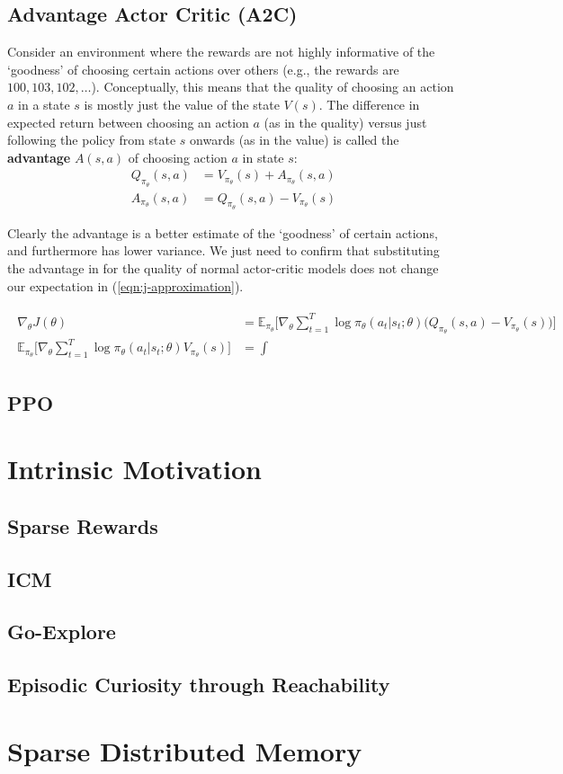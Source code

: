 \documentclass[journal, onecolumn, 12pt, draftclsnofoot]{IEEEtran}
\numberwithin{equation}{section}
\newcommand{\kword}[1]{\textbf{#1}}
\begin{document}
	\subsection{Advantage Actor Critic (A2C)}
	\par Consider an environment where the rewards are not highly informative of the `goodness' of choosing certain actions over others (e.g., the rewards are $100,103,102,\dots$). Conceptually, this means that the quality of choosing an action $a$ in a state $s$ is mostly just the value of the state $V(s)$. The difference in expected return between choosing an action $a$ (as in the quality) versus just following the policy from state $s$ onwards (as in the value) is called the \kword{advantage} $A(s,a)$ of choosing action $a$ in state $s$:
	\begin{align}
		\label{eqn:advantage}
		Q_{\pi_\theta}(s,a) &= V_{\pi_\theta}(s) + A_{\pi_\theta}(s,a) \\
		A_{\pi_\theta}(s,a) &= Q_{\pi_\theta}(s,a) - V_{\pi_\theta}(s) \nonumber
	\end{align}
	\par Clearly the advantage is a better estimate of the `goodness' of certain actions, and furthermore has lower variance. We just need to confirm that substituting the advantage in for the quality of normal actor-critic models does not change our expectation in (\ref{eqn:j-approximation}).

	\begin{align}
		\label{eqn:policy_gradient_theorem_with_baseline}
		\begin{split}
			\nabla_\theta J(\theta) &= \mathbb{E}_{\pi_\theta} \bigg[ \nabla_\theta \sum_{t=1}^T \log \pi_\theta (a_t \vert s_t; \theta) \big( Q_{\pi_\theta}(s,a) - V_{\pi_\theta}(s) \big) \bigg] \\
			\mathbb{E}_{\pi_\theta} \bigg[ \nabla_\theta \sum_{t=1}^T \log \pi_\theta (a_t \vert s_t; \theta) V_{\pi_\theta}(s) \bigg] &= \int
		\end{split}
	\end{align}

	\subsection{PPO}
	\section{Intrinsic Motivation}
	\subsection{Sparse Rewards}
	\subsection{ICM}
	\subsection{Go-Explore}
	\subsection{Episodic Curiosity through Reachability}
	\section{Sparse Distributed Memory}




\end{document}

